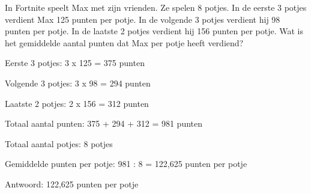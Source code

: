 \begin{opgave}
In Fortnite speelt Max met zijn vrienden. Ze spelen 8 potjes. In de eerste 3 
potjes verdient Max 125 punten per potje. In de volgende 3 potjes verdient hij 
98 punten per potje. In de laatste 2 potjes verdient hij 156 punten per potje. 
Wat is het gemiddelde aantal punten dat Max per potje heeft verdiend?
\end{opgave}

\begin{oplossing}
Eerste 3 potjes: 3 x 125 = 375 punten

Volgende 3 potjes: 3 x 98 = 294 punten

Laatste 2 potjes: 2 x 156 = 312 punten

Totaal aantal punten:
375 + 294 + 312 = 981 punten

Totaal aantal potjes: 8 potjes

Gemiddelde punten per potje:
981 : 8 = 122,625 punten per potje

Antwoord: 122,625 punten per potje
\end{oplossing}
